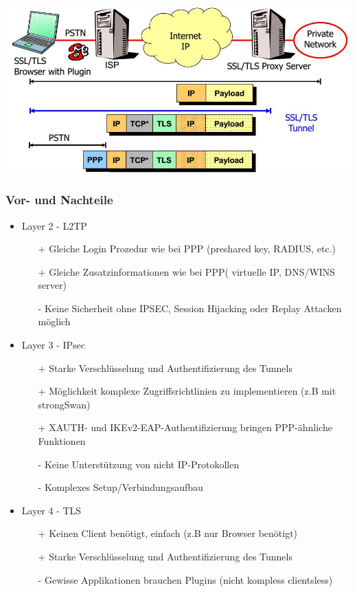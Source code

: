 \begin{description}
		\begin{minipage}[t]{0.4\textwidth}
		\centering
		\includegraphics[width=\linewidth]{images/l4_tls_tunnel}
	\end{minipage}
\end{description}

\subsubsection{Vor- und Nachteile}
\begin{itemize}
    \item Layer 2 - L2TP
    \begin{itemize}
        \item[+] Gleiche Login Prozedur wie bei PPP (preshared key, RADIUS, etc.)
        \item[+] Gleiche Zusatzinformationen wie bei PPP( virtuelle IP, DNS/WINS server)
        \item[-] Keine Sicherheit ohne IPSEC, Session Hijacking oder Replay Attacken möglich
\end{itemize}
\item Layer 3 - IPsec
\begin{itemize}
    \item[+] Starke Verschlüsselung und Authentifizierung des Tunnels
    \item[+] Möglichkeit komplexe Zugriffsrichtlinien zu implementieren (z.B mit strongSwan)
    \item[+] XAUTH- und IKEv2-EAP-Authentifizierung bringen PPP-ähnliche Funktionen
    \item[-] Keine Unterstützung von nicht IP-Protokollen
    \item[-] Komplexes Setup/Verbindungsaufbau
\end{itemize}
\item Layer 4 - TLS
\begin{itemize}
    \item[+] Keinen Client benötigt, einfach (z.B nur Browser benötigt)
    \item[+] Starke Verschlüsselung und Authentifizierung des Tunnels
    \item[-] Gewisse Applikationen brauchen Plugins (nicht kompless clientsless)
\end{itemize}
\end{itemize}

